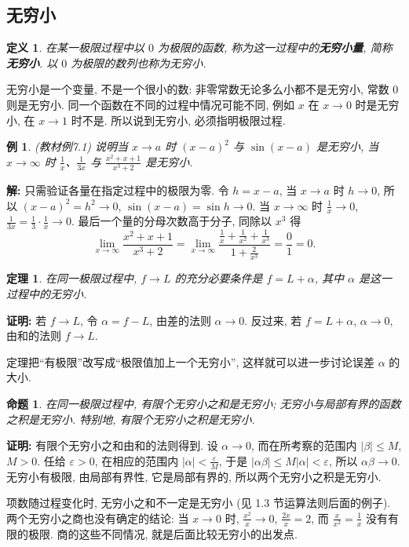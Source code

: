 \documentclass[UTF8,openany]{ctexbook}
\theoremstyle{chinesetextbook}
\newtheorem{definition}{定义}[section]
\newtheorem{example}{例}[section]
\newtheorem{proposition}{命题}[section]
\newenvironment{cnproof}{\par\indent\textbf{证明:} \ignorespaces}{\par}
\newenvironment{cnsolution}{\par\indent\textbf{解:} \ignorespaces}{\par}
\newtheorem*{theoremsingle}{定理}
\begin{document}
\subsection{无穷小}
\begin{definition}
在某一极限过程中以 $0$ 为极限的函数, 称为这一过程中的\textbf{无穷小量}, 简称\textbf{无穷小}. 以 $0$ 为极限的数列也称为无穷小.
\end{definition}
无穷小是一个变量, 不是一个很小的数: 非零常数无论多么小都不是无穷小, 常数 $0$ 则是无穷小. 同一个函数在不同的过程中情况可能不同, 例如 $x$ 在 $x\to0$ 时是无穷小, 在 $x\to1$ 时不是. 所以说到无穷小, 必须指明极限过程.
\begin{example}
\textnormal{(教材例7.1)} 说明当 $x\to a$ 时 $(x-a)^2$ 与 $\sin(x-a)$ 是无穷小, 当 $x\to\infty$ 时 $\displaystyle\frac1x$、$\displaystyle\frac1{3x}$ 与 $\displaystyle\frac{x^2+x+1}{x^3+2}$ 是无穷小.
\end{example}
\begin{cnsolution}
只需验证各量在指定过程中的极限为零. 令 $h=x-a$, 当 $x\to a$ 时 $h\to0$, 所以 $(x-a)^2=h^2\to0$, $\sin(x-a)=\sin h\to0$. 当 $x\to\infty$ 时 $\displaystyle\frac1x\to0$, $\displaystyle\frac1{3x}=\frac13\cdot\frac1x\to0$. 最后一个量的分母次数高于分子, 同除以 $x^3$ 得
\[
\lim_{x\to\infty}\frac{x^2+x+1}{x^3+2}=\lim_{x\to\infty}\frac{\frac1x+\frac1{x^2}+\frac1{x^3}}{1+\frac2{x^3}}=\frac01=0.
\]
\end{cnsolution}
\begin{theoremsingle}
在同一极限过程中, $f\to L$ 的充分必要条件是 $f=L+\alpha$, 其中 $\alpha$ 是这一过程中的无穷小.
\end{theoremsingle}
\begin{cnproof}
若 $f\to L$, 令 $\alpha=f-L$, 由差的法则 $\alpha\to0$. 反过来, 若 $f=L+\alpha$, $\alpha\to0$, 由和的法则 $f\to L$.
\end{cnproof}
定理把“有极限”改写成“极限值加上一个无穷小”, 这样就可以进一步讨论误差 $\alpha$ 的大小.
\begin{proposition}
在同一极限过程中, 有限个无穷小之和是无穷小; 无穷小与局部有界的函数之积是无穷小. 特别地, 有限个无穷小之积是无穷小.
\end{proposition}
\begin{cnproof}
有限个无穷小之和由和的法则得到. 设 $\alpha\to0$, 而在所考察的范围内 $|\beta|\le M$, $M>0$. 任给 $\varepsilon>0$, 在相应的范围内 $\displaystyle|\alpha|<\frac\varepsilon M$, 于是 $|\alpha\beta|\le M|\alpha|<\varepsilon$, 所以 $\alpha\beta\to0$. 无穷小有极限, 由局部有界性, 它是局部有界的, 所以两个无穷小之积是无穷小.
\end{cnproof}
项数随过程变化时, 无穷小之和不一定是无穷小 (见 1.3 节运算法则后面的例子). 两个无穷小之商也没有确定的结论: 当 $x\to0$ 时, $\displaystyle\frac{x^2}x\to0$, $\displaystyle\frac{2x}x=2$, 而 $\displaystyle\frac x{x^2}=\frac1x$ 没有有限的极限. 商的这些不同情况, 就是后面比较无穷小的出发点.
\end{document}
